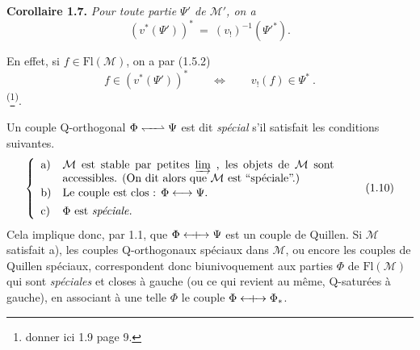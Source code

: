\textbf{Corollaire 1.7.} \textit{Pour toute partie $\Psi'$ de $\mathcal{M}'$, on a}
\[
(v^{*}(\Psi'))^{*} \ =\ (v_{!})^{-1}(\Psi'^{*}). \tag*{(1.7.1)}
\]

En effet, si $f \in \mathrm{Fl}(\mathcal{M})$, on a par (1.5.2)
\[
f \in (v^{*}(\Psi'))^{*} \qquad \Longleftrightarrow \qquad v_{!}(f) \in \Psi^{*}\ . %
\]
\textsuperscript{(}\footnote[3]{donner ici 1.9 page 9.}\textsuperscript{)}.

Un couple Q-orthogonal $\Phi \Qorth \Psi$ est dit \textit{spécial} s'il satisfait les conditions suivantes.
\[
\left\{
\begin{array}{ll}
\text{a)} & \parbox[t]{0.7\textwidth}{$\mathcal{M}$ est stable par petites $\varinjlim$ , les objets de $\mathcal{M}$ sont accessibles. (On dit alors que $\mathcal{M}$ est “spéciale”.)} \\[3ex]
\text{b)} & \text{Le couple est clos : } \Phi \clos \Psi. \\[1ex]
\text{c)} & \Phi \text{ est \textit{spéciale.}}
\end{array}
\right.
\tag*{(1.10)}
\]
Cela implique donc, par 1.1, que $\Phi \mathrel{\leftarrow\mkern-9mu{+}\mkern-9mu\rightarrow} \Psi$ est un couple de Quillen. Si $\mathcal{M}$ satisfait a), les couples Q-orthogonaux spéciaux dans $\mathcal{M}$, ou encore les couples de Quillen spéciaux, correspondent donc biunivoquement aux parties $\Phi$ de $\mathrm{Fl}(\mathcal{M})$ qui sont \textit{spéciales} et closes à gauche (ou ce qui revient au même, Q-saturées à gauche), en associant à une telle $\Phi$ le couple $\Phi \mathrel{\leftarrow\mkern-9mu{+}\mkern-9mu\rightarrow} \Phi_{*}$.

